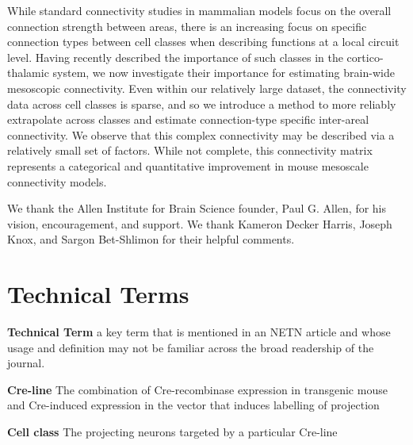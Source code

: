 \documentclass[NETN,manuscript]{stjour-new}
\begin{document}
\begin{authorsummary}
While standard connectivity studies in mammalian models focus on the overall connection strength between areas, there is an increasing focus on specific connection types between cell classes when describing functions at a local circuit level.
Having recently described the importance of such classes in the cortico-thalamic system, we now investigate their importance for estimating brain-wide mesoscopic connectivity.
Even within our relatively large dataset, the connectivity data across cell classes is sparse, and so we introduce a method to more reliably extrapolate across classes and estimate connection-type specific inter-areal connectivity.
We observe that this complex connectivity may be described via a relatively small set of factors. 
While not complete, this connectivity matrix represents a categorical and quantitative improvement in mouse mesoscale connectivity models.

\end{authorsummary}

\newpage


\newpage

\newpage

\newpage


\newpage

\acknowledgments
We thank the Allen Institute for Brain Science founder, Paul G. Allen, for his vision, encouragement, and support. We thank Kameron Decker Harris, Joseph Knox, and Sargon Bet-Shlimon for their helpful comments.
\newpage



\newpage


\newpage

\section{Technical Terms}

\textbf{Technical Term} a key term that is mentioned in an NETN article and whose usage and definition may not be familiar across the broad readership of the journal. 

\textbf{Cre-line}  The combination of Cre-recombinase expression in transgenic mouse and Cre-induced expression in the vector that induces labelling of projection

\textbf{Cell class} The projecting neurons targeted by a particular Cre-line
\end{document}
